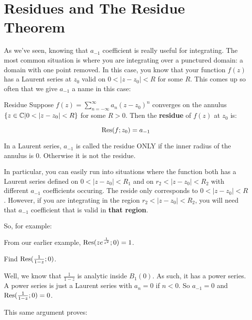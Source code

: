 \section{Residues and The Residue Theorem}

As we've seen, knowing that $a_{-1}$ coefficient is really useful for integrating. The most common situation is where you are integrating over a punctured domain: a domain with one point removed. In this case, you know that your function $f(z)$ has a Laurent series at $z_0$ valid on $0 < |z-z_0| < R$ for some $R$. This comes up so often that we give $a_{-1}$ a name in this case:


\begin{defbo}{Residue}{} Suppose $f(z) = \sum_{n = -\infty}^\infty a_n(z-z_0)^n$ converges on the annulus $\{z\in \mathbb{C}|0 < |z-z_0| < R\}$ for some $R > 0$. Then the {\bf residue} of $f(z)$ at $z_0$ is:

$$\mathrm{Res}(f;z_0) = a_{-1}$$
\end{defbo}

\begin{warn}{}{}In a Laurent series, $a_{-1}$ is called the residue ONLY if the inner radius of the annulus is $0$. Otherwise it is not the residue.

In particular, you can easily run into situations where the function both has a Laurent series defined on $0 < |z-z_0| < R_1$ and on $r_2 < |z-z_0| < R_2$ with different $a_{-1}$ coefficients occuring. The reside only corresponds to $0 < |z-z_0| < R$. However, if you are integrating in the region $r_2 < |z-z_0| < R_2$, you will need that $a_{-1}$ coefficient that is valid in {\bf that region}.

\end{warn}


So, for example:

\begin{ex}{}{} From our earlier example, $\mathrm{Res}(ze^{\frac{1}{z^2}};0) = 1$.
\end{ex}

\begin{ex}{}{}Find $\mathrm{Res}(\frac{1}{1-z};0)$.

Well, we know that $\frac{1}{1-z}$ is analytic inside $B_1(0)$. As such, it has a power series. A power series is just a Laurent series with $a_n = 0$ if $n < 0$. So $a_{-1} = 0$ and $\mathrm{Res}(\frac{1}{1-z};0) = 0$.
\end{ex}

This same argument proves:

